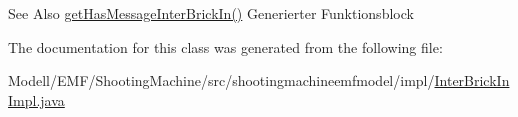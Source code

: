 \begin{DoxySeeAlso}{See Also}
\hyperlink{classshootingmachineemfmodel_1_1impl_1_1_inter_brick_in_impl_aa379228bebb5f021ecb19114f8637e3b}{get\-Has\-Message\-Inter\-Brick\-In()} Generierter Funktionsblock  
\end{DoxySeeAlso}


The documentation for this class was generated from the following file\-:\begin{DoxyCompactItemize}
\item 
Modell/\-E\-M\-F/\-Shooting\-Machine/src/shootingmachineemfmodel/impl/\hyperlink{_inter_brick_in_impl_8java}{Inter\-Brick\-In\-Impl.\-java}\end{DoxyCompactItemize}
